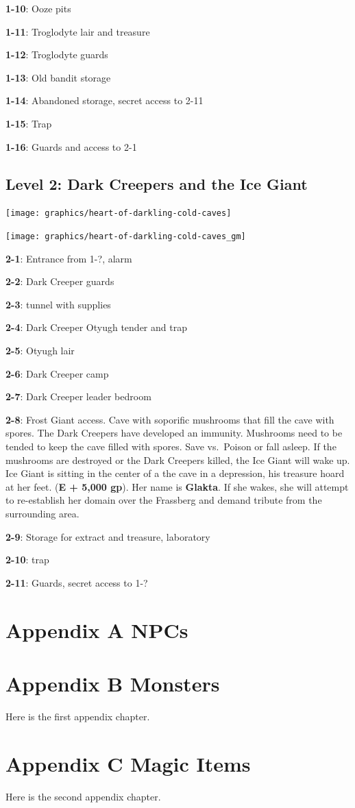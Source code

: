 \documentclass[
]{book}
\begin{document}
\textbf{1-10}: Ooze pits

\textbf{1-11}: Troglodyte lair and treasure

\textbf{1-12}: Troglodyte guards

\textbf{1-13}: Old bandit storage

\textbf{1-14}: Abandoned storage, secret access to 2-11

\textbf{1-15}: Trap

\textbf{1-16}: Guards and access to 2-1

\section{Level 2: Dark Creepers and the Ice Giant}\label{level-2-dark-creepers-and-the-ice-giant}

\begin{center}\texttt{[image: graphics/heart-of-darkling-cold-caves]} \end{center}

\begin{center}\texttt{[image: graphics/heart-of-darkling-cold-caves\_gm]} \end{center}

\textbf{2-1}: Entrance from 1-?, alarm

\textbf{2-2}: Dark Creeper guards

\textbf{2-3}: tunnel with supplies

\textbf{2-4}: Dark Creeper Otyugh tender and trap

\textbf{2-5}: Otyugh lair

\textbf{2-6}: Dark Creeper camp

\textbf{2-7}: Dark Creeper leader bedroom

\textbf{2-8}: Frost Giant access. Cave with soporific mushrooms that fill the cave with spores. The Dark Creepers have developed an immunity. Mushrooms need to be tended to keep the cave filled with spores. Save vs.~Poison or fall asleep. If the mushrooms are destroyed or the Dark Creepers killed, the Ice Giant will wake up. Ice Giant is sitting in the center of a the cave in a depression, his treasure hoard at her feet. (\textbf{E + 5,000 gp}). Her name is \textbf{Glakta}. If she wakes, she will attempt to re-establish her domain over the Frassberg and demand tribute from the surrounding area.

\textbf{2-9}: Storage for extract and treasure, laboratory

\textbf{2-10}: trap

\textbf{2-11}: Guards, secret access to 1-?

\appendix


\chapter{Appendix A NPCs}\label{npcs}

\chapter{Appendix B Monsters}\label{appendix-b-monsters}

Here is the first appendix chapter.

\chapter{Appendix C Magic Items}\label{appendix-c-magic-items}

Here is the second appendix chapter.

  
\end{document}
